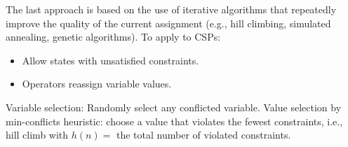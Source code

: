 \documentclass[12pt]{article}
\begin{document}
\begin{enumerate}
          The last approach is based on the use of iterative algorithms that repeatedly improve the quality of the current assignment (e.g., hill climbing, simulated annealing, genetic algorithms). To apply to CSPs:
          \begin{itemize}
              \item Allow states with unsatisfied constraints.
              \item Operators reassign variable values.
          \end{itemize}
          Variable selection: Randomly select any conflicted variable. Value selection by min-conflicts heuristic: choose a value that violates the fewest constraints, i.e., hill climb with $h(n) = $ the total number of violated constraints.

\end{enumerate}
\end{document}
